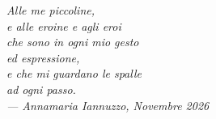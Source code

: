 \cleardoublepage
\thispagestyle{empty}

\vspace*{0.25\textheight}

\begin{flushright}
\itshape
Alle me piccoline,\\
e alle eroine e agli eroi\\
che sono in ogni mio gesto\\
ed espressione,\\
e che mi guardano le spalle\\
ad ogni passo.\\



\vspace{1em}
\normalfont --- Annamaria Iannuzzo, Novembre 2026
\end{flushright}

\cleardoublepage
